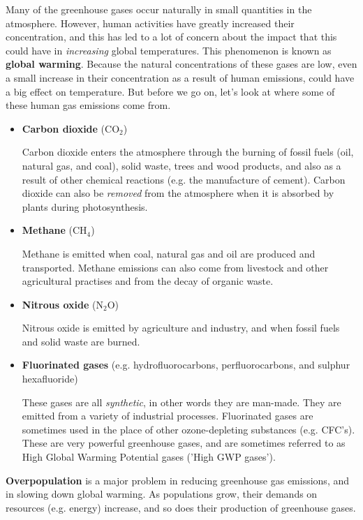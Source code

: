 Many of the greenhouse gases occur naturally in small quantities in the atmosphere. However, human activities have greatly increased their concentration, and this has led to a lot of concern about the impact that this could have in \textit{increasing} global temperatures. This phenomenon is known as \textbf{global warming}. Because the natural concentrations of these gases are low, even a small increase in their concentration as a result of human emissions, could have a big effect on temperature. But before we go on, let's look at where some of these human gas emissions come from.

\begin{itemize}

\item{\textbf{Carbon dioxide} (CO$_{2}$)

Carbon dioxide enters the atmosphere through the burning of fossil fuels (oil, natural gas, and coal), solid waste, trees and wood products, and also as a result of other chemical reactions (e.g. the manufacture of cement). Carbon dioxide can also be \textit{removed} from the atmosphere when it is absorbed by plants during photosynthesis.}

\item{\textbf{Methane} (CH$_{4}$)

Methane is emitted when coal, natural gas and oil are produced and transported. Methane emissions can also come from livestock and other agricultural practises and from the decay of organic waste.}

\item{\textbf{Nitrous oxide} (N$_{2}$O)

Nitrous oxide is emitted by agriculture and industry, and when fossil fuels and solid waste are burned.}

\item{\textbf{Fluorinated gases} (e.g. hydrofluorocarbons, perfluorocarbons, and sulphur hexafluoride)

These gases are all \textit{synthetic}, in other words they are man-made. They are emitted from a variety of industrial processes. Fluorinated gases are sometimes used in the place of other ozone-depleting substances (e.g. CFC's). These are very powerful greenhouse gases, and are sometimes referred to as High Global Warming Potential gases ('High GWP gases').}

\end{itemize}

\textbf{Overpopulation} is a major problem in reducing greenhouse gas emissions, and in slowing down global warming. As populations grow, their demands on resources (e.g. energy) increase, and so does their production of greenhouse gases.\\

